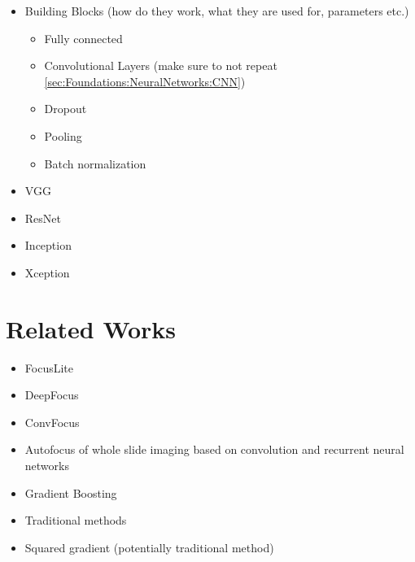 \begin{itemize}
    \item Building Blocks (how do they work, what they are used for, parameters etc.)
    \begin{itemize}
        \item Fully connected
        \item Convolutional Layers (make sure to not repeat \autoref{sec:Foundations:NeuralNetworks:CNN})
        \item Dropout
        \item Pooling
        \item Batch normalization
    \end{itemize}
    \item VGG
    \item ResNet
    \item Inception
    \item Xception
\end{itemize}

\section{Related Works}
\label{sec:Foundations:RelatedWorks}

\begin{itemize}
    \item FocusLite \cite{wang2020focuslitenn}
    \item DeepFocus \cite{senaras2018deepfocus}
    \item ConvFocus \cite{kohlberger2019wholeslide}  
    \item Autofocus of whole slide imaging based on convolution and recurrent neural networks \cite{xiang2021autofocus}
    \item Gradient Boosting \cite{liang2019learning}
    \item Traditional methods \cite{redondo2012autofocus}
    \item Squared gradient (potentially traditional method)
\end{itemize}



